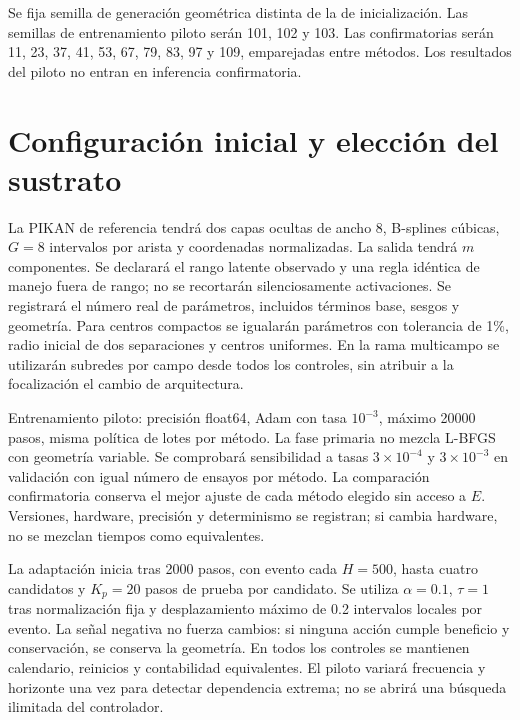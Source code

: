 Se fija semilla de generación geométrica distinta de la de inicialización. Las semillas de entrenamiento piloto serán 101, 102 y 103. Las confirmatorias serán 11, 23, 37, 41, 53, 67, 79, 83, 97 y 109, emparejadas entre métodos. Los resultados del piloto no entran en inferencia confirmatoria.

\section{Configuración inicial y elección del sustrato}
La PIKAN de referencia tendrá dos capas ocultas de ancho 8, B-splines cúbicas, $G=8$ intervalos por arista y coordenadas normalizadas. La salida tendrá $m$ componentes. Se declarará el rango latente observado y una regla idéntica de manejo fuera de rango; no se recortarán silenciosamente activaciones. Se registrará el número real de parámetros, incluidos términos base, sesgos y geometría. Para centros compactos se igualarán parámetros con tolerancia de 1\%, radio inicial de dos separaciones y centros uniformes. En la rama multicampo se utilizarán subredes por campo desde todos los controles, sin atribuir a la focalización el cambio de arquitectura.

Entrenamiento piloto: precisión float64, Adam con tasa $10^{-3}$, máximo 20000 pasos, misma política de lotes por método. La fase primaria no mezcla L-BFGS con geometría variable. Se comprobará sensibilidad a tasas $3\times10^{-4}$ y $3\times10^{-3}$ en validación con igual número de ensayos por método. La comparación confirmatoria conserva el mejor ajuste de cada método elegido sin acceso a $E$. Versiones, hardware, precisión y determinismo se registran; si cambia hardware, no se mezclan tiempos como equivalentes.

La adaptación inicia tras 2000 pasos, con evento cada $H=500$, hasta cuatro candidatos y $K_p=20$ pasos de prueba por candidato. Se utiliza $\alpha=0.1$, $\tau=1$ tras normalización fija y desplazamiento máximo de 0.2 intervalos locales por evento. La señal negativa no fuerza cambios: si ninguna acción cumple beneficio y conservación, se conserva la geometría. En todos los controles se mantienen calendario, reinicios y contabilidad equivalentes. El piloto variará frecuencia y horizonte una vez para detectar dependencia extrema; no se abrirá una búsqueda ilimitada del controlador.

